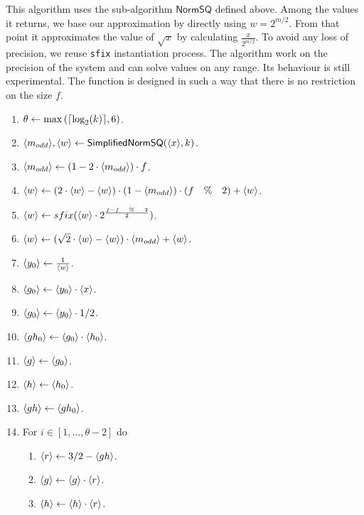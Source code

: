 This algorithm uses the sub-algorithm $\mathsf{NormSQ}$ defined above. Among the values it returns, we base our approximation by directly using $w =2^{m/2}$. From that point it approximates the  value of $\sqrt{x}$ by calculating $\frac{x}{2^{m/2}}$. To avoid any loss of precision, we reuse \verb|sfix| instantiation process.
The algorithm work on the precision of the system and can solve values on any range. Its behaviour is still experimental. The function is designed in such a way that there is no restriction on the size $f$.
\begin{enumerate}
\item $\theta \leftarrow \max{({\lceil \log_2(k) \rceil},6)}$.
\item $\langle m_{odd} \rangle, \langle w \rangle \leftarrow \mathsf{SimplifiedNormSQ}(\langle x \rangle,k)$.
\item $\langle m_{odd} \rangle \leftarrow (1 - 2 \cdot \langle m_{odd} \rangle) \cdot f$.   
 \item $\langle w \rangle \leftarrow (2 \cdot \langle w \rangle -\langle w \rangle) \cdot (1 - \langle m_{odd} \rangle) \cdot (f \quad \% \quad 2) + \langle w \rangle$.
\item $\langle w \rangle \leftarrow sfix( \langle w \rangle \cdot 2 ^{\frac{f - f \quad \% \quad 2}{2}})$.
\item $\langle w \rangle \leftarrow (\sqrt{2}\cdot \langle w \rangle - \langle w \rangle)\cdot \langle m_{odd} \rangle + \langle w \rangle$.
\item $\langle y_0 \rangle \leftarrow \frac{1}{\langle w \rangle} $.
\item $\langle g_0 \rangle \leftarrow \langle y_0 \rangle \cdot \langle x \rangle$.
\item $\langle g_0 \rangle \leftarrow \langle y_0 \rangle \cdot 1/2$.
\item $\langle gh_0 \rangle \leftarrow \langle g_0 \rangle \cdot \langle h_0 \rangle$.
\item $\langle g \rangle \leftarrow \langle g_0 \rangle$.
\item $\langle h \rangle \leftarrow \langle h_0 \rangle$.
\item $\langle gh \rangle \leftarrow \langle gh_0 \rangle$.
\item For $i \in[1,\ldots,\theta-2]$ do
\begin{enumerate}
  \item $\langle r \rangle \leftarrow 3/2-\langle gh \rangle$.
  \item $\langle g \rangle \leftarrow \langle g \rangle \cdot \langle r \rangle$.
  \item $\langle h \rangle \leftarrow \langle h \rangle \cdot \langle r \rangle$.

\end{enumerate}
\end{enumerate}
